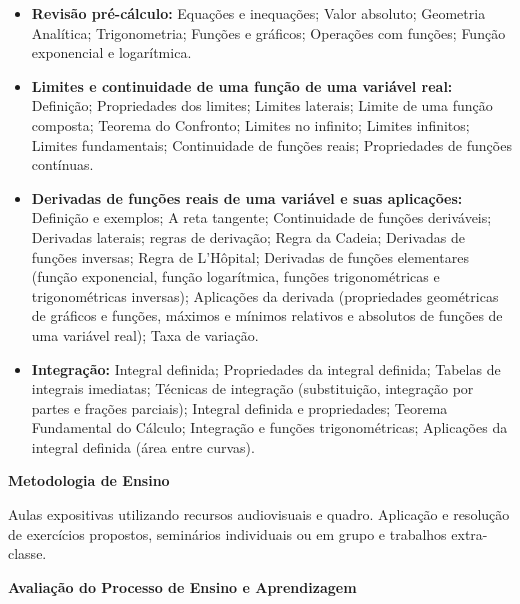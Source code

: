 \begin{itemize}

 \item \textbf{Revisão pré-cálculo:} Equações e inequações; Valor absoluto; Geometria Analítica; Trigonometria; Funções e gráficos; Operações com funções; Função exponencial e logarítmica.
 
 \item \textbf{Limites e continuidade de uma função de uma variável real:} Definição; Propriedades dos limites; Limites laterais; Limite de uma função composta; Teorema do Confronto; Limites no infinito; Limites infinitos; Limites fundamentais; Continuidade de funções reais; Propriedades de funções contínuas.
 
 \item \textbf{Derivadas de funções reais de uma variável e suas aplicações:} Definição e exemplos; A reta tangente; Continuidade de funções deriváveis; Derivadas laterais; regras de derivação; Regra da Cadeia; Derivadas de funções inversas; Regra de L'Hôpital; Derivadas de funções elementares (função exponencial, função logarítmica, funções trigonométricas e trigonométricas inversas); Aplicações da derivada (propriedades geométricas de gráficos e funções, máximos e mínimos relativos e absolutos de funções de uma variável real); Taxa de variação.
 
 \item \textbf{Integração:} Integral definida; Propriedades da integral definida; Tabelas de integrais imediatas; Técnicas de integração (substituição, integração por partes e frações parciais); Integral definida e propriedades; Teorema Fundamental do Cálculo; Integração e funções trigonométricas; Aplicações da integral definida (área entre curvas).
 
\end{itemize}

\begin{snugshade}\begin{center}\textbf{
    Metodologia de Ensino
}\end{center}\end{snugshade}

\noindent
   Aulas expositivas utilizando recursos audiovisuais e quadro. Aplicação e resolução de exercícios propostos, seminários individuais ou em grupo e trabalhos extra-classe.

\begin{snugshade}\begin{center}\textbf{
    Avaliação do Processo de Ensino e Aprendizagem
}\end{center}\end{snugshade}

